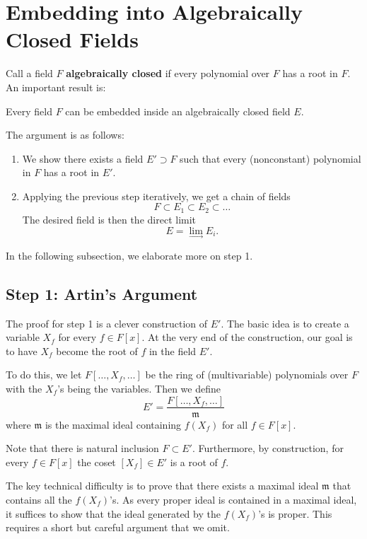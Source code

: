 \section{Embedding into Algebraically Closed Fields}
Call a field $F$ \textbf{algebraically closed} if every polynomial over $F$ has a root in $F$. An important result is:
\begin{center}
    Every field $F$ can be embedded inside an algebraically closed field $E$.
\end{center}
The argument is as follows:
\begin{enumerate}
    \item We show there exists a field $E' \supset F$ such that every (nonconstant) polynomial in $F$ has a root in $E'$.

    \item Applying the previous step iteratively, we get a chain of fields
        \[
            F \subset E_1 \subset E_2 \subset \dots
        \]
        The desired field is then the direct limit
        \[
            E = \lim_{\longrightarrow} E_i.
        \]
\end{enumerate}
In the following subsection, we elaborate more on step 1.

\subsection{Step 1: Artin's Argument}
The proof for step 1 is a clever construction of $E'$. The basic idea is to create a variable $X_f$ for every $f \in F[x]$. At the very end of the construction, our goal is to have $X_f$ become the root of $f$ in the field $E'$.

To do this, we let $F[\dots, X_f, \dots]$ be the ring of (multivariable) polynomials over $F$ with the $X_f$'s being the variables. Then we define
\[
    E' = \frac{F[\dots, X_f, \dots]}{\mathfrak m}
\]
where $\mathfrak m$ is the maximal ideal containing $f(X_f)$ for all $f \in F[x]$.

Note that there is natural inclusion $F \subset E'$. Furthermore, by construction, for every $f \in F[x]$ the coset $[X_f] \in E'$ is a root of $f$.

The key technical difficulty is to prove that there exists a maximal ideal $\mathfrak m$ that contains all the $f(X_f)$'s. As every proper ideal is contained in a maximal ideal, it suffices to show that the ideal generated by the $f(X_f)$'s is proper. This requires a short but careful argument that we omit.
